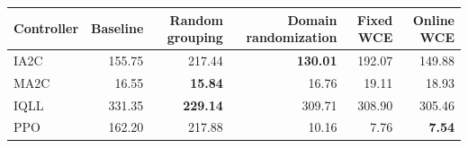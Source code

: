 \begin{tabular}{lrrrrr}
\hline
Controller & Baseline & Random grouping & Domain randomization & Fixed WCE & Online WCE \\
\hline
IA2C & 155.75 & 217.44 & \textbf{130.01} & 192.07 & 149.88 \\
MA2C & 16.55 & \textbf{15.84} & 16.76 & 19.11 & 18.93 \\
IQLL & 331.35 & \textbf{229.14} & 309.71 & 308.90 & 305.46 \\
PPO & 162.20 & 217.88 & 10.16 & 7.76 & \textbf{7.54} \\
\hline
\end{tabular}
